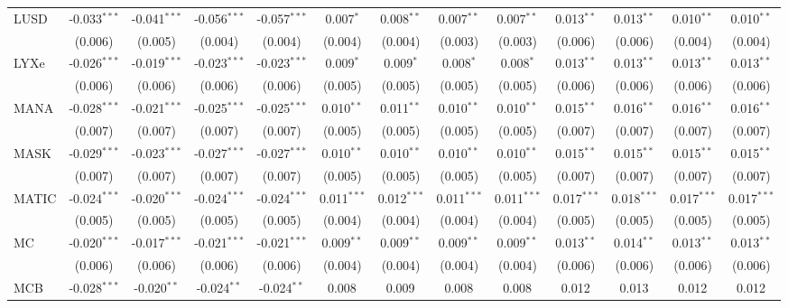 \begin{table}[!htbp]
\begin{tabular}{@{\extracolsep{5pt}}lcccccccccccc}
 LUSD & -0.033$^{***}$ & -0.041$^{***}$ & -0.056$^{***}$ & -0.057$^{***}$ & 0.007$^{*}$ & 0.008$^{**}$ & 0.007$^{**}$ & 0.007$^{**}$ & 0.013$^{**}$ & 0.013$^{**}$ & 0.010$^{**}$ & 0.010$^{**}$ \\
  & (0.006) & (0.005) & (0.004) & (0.004) & (0.004) & (0.004) & (0.003) & (0.003) & (0.006) & (0.006) & (0.004) & (0.004) \\
 LYXe & -0.026$^{***}$ & -0.019$^{***}$ & -0.023$^{***}$ & -0.023$^{***}$ & 0.009$^{*}$ & 0.009$^{*}$ & 0.008$^{*}$ & 0.008$^{*}$ & 0.013$^{**}$ & 0.013$^{**}$ & 0.013$^{**}$ & 0.013$^{**}$ \\
  & (0.006) & (0.006) & (0.006) & (0.006) & (0.005) & (0.005) & (0.005) & (0.005) & (0.006) & (0.006) & (0.006) & (0.006) \\
 MANA & -0.028$^{***}$ & -0.021$^{***}$ & -0.025$^{***}$ & -0.025$^{***}$ & 0.010$^{**}$ & 0.011$^{**}$ & 0.010$^{**}$ & 0.010$^{**}$ & 0.015$^{**}$ & 0.016$^{**}$ & 0.016$^{**}$ & 0.016$^{**}$ \\
  & (0.007) & (0.007) & (0.007) & (0.007) & (0.005) & (0.005) & (0.005) & (0.005) & (0.007) & (0.007) & (0.007) & (0.007) \\
 MASK & -0.029$^{***}$ & -0.023$^{***}$ & -0.027$^{***}$ & -0.027$^{***}$ & 0.010$^{**}$ & 0.010$^{**}$ & 0.010$^{**}$ & 0.010$^{**}$ & 0.015$^{**}$ & 0.015$^{**}$ & 0.015$^{**}$ & 0.015$^{**}$ \\
  & (0.007) & (0.007) & (0.007) & (0.007) & (0.005) & (0.005) & (0.005) & (0.005) & (0.007) & (0.007) & (0.007) & (0.007) \\
 MATIC & -0.024$^{***}$ & -0.020$^{***}$ & -0.024$^{***}$ & -0.024$^{***}$ & 0.011$^{***}$ & 0.012$^{***}$ & 0.011$^{***}$ & 0.011$^{***}$ & 0.017$^{***}$ & 0.018$^{***}$ & 0.017$^{***}$ & 0.017$^{***}$ \\
  & (0.005) & (0.005) & (0.005) & (0.005) & (0.004) & (0.004) & (0.004) & (0.004) & (0.005) & (0.005) & (0.005) & (0.005) \\
 MC & -0.020$^{***}$ & -0.017$^{***}$ & -0.021$^{***}$ & -0.021$^{***}$ & 0.009$^{**}$ & 0.009$^{**}$ & 0.009$^{**}$ & 0.009$^{**}$ & 0.013$^{**}$ & 0.014$^{**}$ & 0.013$^{**}$ & 0.013$^{**}$ \\
  & (0.006) & (0.006) & (0.006) & (0.006) & (0.004) & (0.004) & (0.004) & (0.004) & (0.006) & (0.006) & (0.006) & (0.006) \\
 MCB & -0.028$^{***}$ & -0.020$^{**}$ & -0.024$^{**}$ & -0.024$^{**}$ & 0.008$^{}$ & 0.009$^{}$ & 0.008$^{}$ & 0.008$^{}$ & 0.012$^{}$ & 0.013$^{}$ & 0.012$^{}$ & 0.012$^{}$ \\

\end{tabular}
\end{table}
